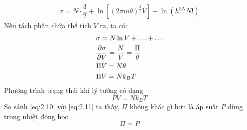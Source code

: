 	\begin{align*}
		\sigma = N \cdot \dfrac{3}{2} + \ln \left[\left(2\pi m \theta\right)^\frac{3}{2}V\right] - \ln\left(h^{3N}N!\right)
	\end{align*}
	Nếu tách phần chứa thể tích $ V $ ra, ta có:
	\begin{align}\label{eq:2.10}
		& \sigma = N \ln V + \ldots + \ldots \notag \\
		& \dfrac{\partial \sigma}{\partial V} = \dfrac{N}{V} = \dfrac{\Pi}{\theta} \notag \\
		& \Pi V = N \theta \notag \\
		& \Pi V = N k_B T
	\end{align}
	Phương trình trạng thái khí lý tưởng có dạng
	\begin{equation}\label{eq:2.11}
		PV = N k_B T
	\end{equation}
	So sánh \eqref{eq:2.10} với \eqref{eq:2.11} ta thấy, $ \Pi $ không khác gì hơn là áp suất $ P $ dùng trong nhiệt động học
	\begin{equation}\label{eq:2.12}
		\Pi = P
	\end{equation}